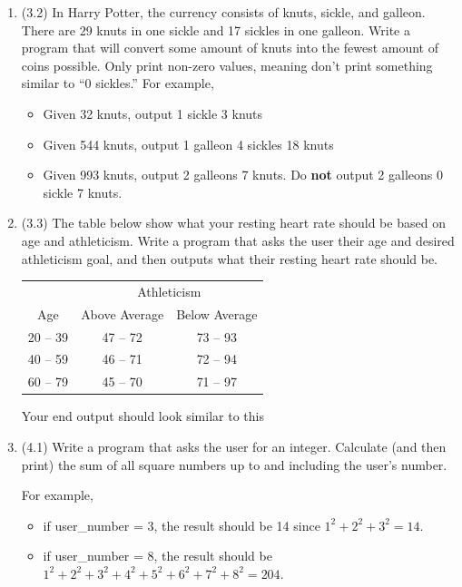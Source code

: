 \documentclass{article}
\begin{document}
\begin{enumerate}
\item (3.2)  
		In Harry Potter, the currency consists of knuts, sickle, and galleon.  There are 29 knuts in 
		one sickle and 17 sickles in one galleon.  Write a program that will convert some amount of 
		knuts into the fewest amount of coins possible.  Only print non-zero values, meaning don't 
		print something similar to ``0 sickles.''  For example,
		\begin{itemize}
			\item Given 32 knuts, output 1 sickle 3 knuts
			\item Given 544 knuts, output 1 galleon 4 sickles 18 knuts
			\item Given 993 knuts, output 2 galleons 7 knuts. 
				Do \textbf{not} output 2 galleons 0 sickle 7 knuts.
		\end{itemize}




\item (3.3)  
		The table below show what your resting heart rate should be based on age and athleticism.  
		Write a program that asks the user their age and desired athleticism goal, and then outputs 
		what their resting heart rate should be.

		\begin{minipage}{.45\textwidth}
			\begin{tabular}{c|cc}
				& \multicolumn{2}{c}{Athleticism}\\
				Age & Above Average & Below Average \\ \hline
				20 -- 39 & 47 -- 72 & 73 -- 93\\
				40 -- 59 & 46 -- 71 & 72 -- 94\\
				60 -- 79 & 45 -- 70 & 71 -- 97 \\
			\end{tabular}
		\end{minipage}
		\begin{minipage}{.45\textwidth}
			\vspace*{1em}
			Your end output should look similar to this
		\end{minipage}





\item (4.1)  
		Write a program that asks the user for an integer.  Calculate (and then print) the 
		sum of all square numbers up to and including the user's number.

		For example, 
		\begin{itemize}
			\item if user\_number = 3, the result should be 14 since $1^2 + 2^2 + 3^2 = 14$.
			\item if user\_number = 8, the result should be $1^2+2^2+3^2+4^2+5^2+6^2+7^2+8^2=204$.
		\end{itemize}


\end{enumerate}
\end{document}
